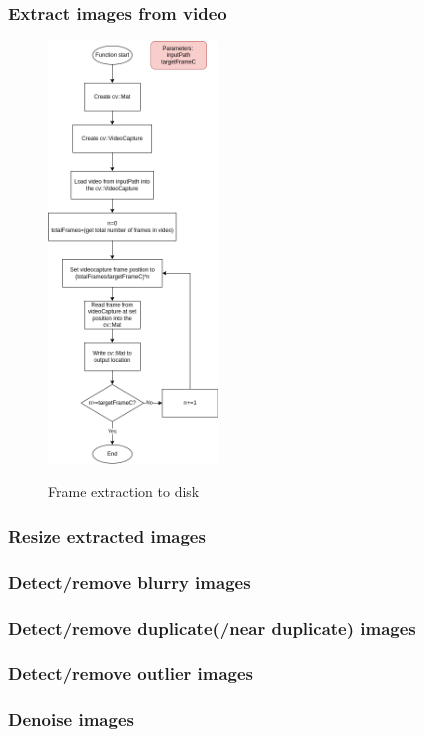 \documentclass[11pt]{report}
\begin{document}
\subsubsection{Extract images from video}
\begin{figure}[h!]
	\centering
	\caption{Frame extraction to disk}
	\includegraphics[width=0.4\textwidth]{designDiagrams/extractFrames}
	\label{fig:extractFrames}
\end{figure}
\newpage
\subsubsection{Resize extracted images}
\subsubsection{Detect/remove blurry images}
\subsubsection{Detect/remove duplicate(/near duplicate) images}
\subsubsection{Detect/remove outlier images}
\subsubsection{Denoise images}
\end{document}
